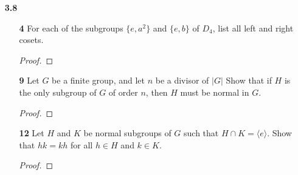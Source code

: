 \documentclass[paper=usletter, fontsize=12pt]{article}
\begin{document}
\begin{itemize}
\begin{enumerate}
            \item[\textbf{10}] Let $G$ be the group of affine functions from
            $\mathbb{R}$ into $\mathbb{R}$, as defined in Exercise 10 of
            Section 3.1. Define $\phi:G \rightarrow \mathbb{R}^{\times}$ as
            follows: for any function $f_{m,b} \in G$, let $\phi(f_{m,b})=m$.
            Prove that $\phi$ is a group homomorphism, and find its kernel and
            image.
            \begin{proof}
            \end{proof}

            \item[\textbf{14}] Recall that the center of a group $G$ is $\{x
            \in G \mid xh=gx \text{ for all } g \in G\}$. Prove that the center
            of any group is a normal subgroup.
            \begin{proof}
            \end{proof}

            \item[\textbf{18}] Let the dihedral group $D_n$ be given by
            elements $a$ of order $n$ and $b$ of order 2, where $ba=a^{-1}b$.
            Show that any subgroup of $\langle a\rangle$ is normal in $D_n$.
            \begin{proof}
            \end{proof}

        \end{enumerate}

        \item[\textbf{3.8}]
        \begin{enumerate}

            \item[\textbf{4}] For each of the subgroups $\{e, a^2\}$ and
            $\{e,b\}$ of $D_4$, list all left and right cosets.
            \begin{proof}
            \end{proof}

            \item[\textbf{9}] Let $G$ be a finite group, and let $n$ be a
            divisor of $|G|$ Show that if $H$ is the only subgroup of $G$ of
            order $n$, then $H$ must be normal in $G$.
            \begin{proof}
            \end{proof}

            \item[\textbf{12}] Let $H$ and $K$ be normal subgroups of $G$ such
            that $H \cap K=\langle e \rangle$. Show that $hk=kh$ for all $h \in
            H$ and $k \in K$.
            \begin{proof}
            \end{proof}


\end{enumerate}
\end{itemize}
\end{document}
